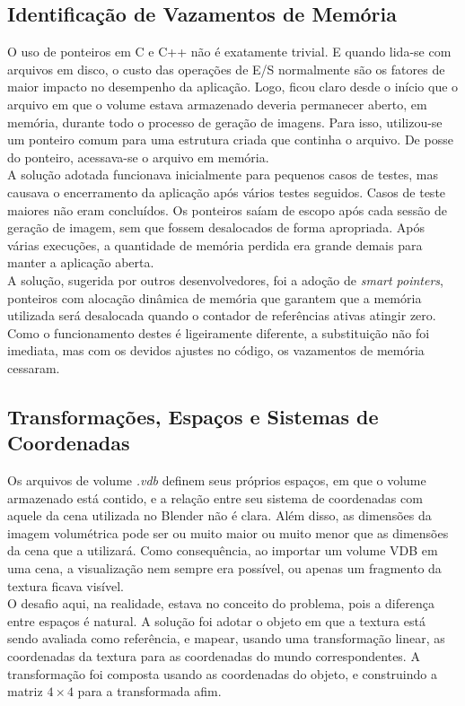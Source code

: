 \subsection*{Identificação de Vazamentos de Memória}
O uso de ponteiros em C e C++ não é exatamente trivial. E quando lida-se com arquivos em disco, o custo das operações de E/S normalmente são os fatores de maior impacto no desempenho da aplicação. Logo, ficou claro desde o início que o arquivo em que o volume estava armazenado deveria permanecer aberto, em memória, durante todo o processo de geração de imagens. Para isso, utilizou-se um ponteiro comum para uma estrutura criada que continha o arquivo. De posse do ponteiro, acessava-se o arquivo em memória.\\

A solução adotada funcionava inicialmente para pequenos casos de testes, mas causava o encerramento da aplicação após vários testes seguidos. Casos de teste maiores não eram concluídos. Os ponteiros saíam de escopo após cada sessão de geração de imagem, sem que fossem desalocados de forma apropriada. Após várias execuções, a quantidade de memória perdida era grande demais para manter a aplicação aberta.\\

A solução, sugerida por outros desenvolvedores, foi a adoção de \emph{smart pointers}, ponteiros com alocação dinâmica de memória que garantem que a memória utilizada será desalocada quando o contador de referências ativas atingir zero. Como o funcionamento destes é ligeiramente diferente, a substituição não foi imediata, mas com os devidos ajustes no código, os vazamentos de memória cessaram.

\subsection*{Transformações, Espaços e Sistemas de Coordenadas}
Os arquivos de volume {\it .vdb} definem seus próprios espaços, em que o volume armazenado está contido, e a relação entre seu sistema de coordenadas com aquele da cena utilizada no Blender não é clara. Além disso, as dimensões da imagem volumétrica pode ser ou muito maior ou muito menor que as dimensões da cena que a utilizará. Como consequência, ao importar um volume VDB em uma cena, a visualização nem sempre era possível, ou apenas um fragmento da textura ficava visível. \\

O desafio aqui, na realidade, estava no conceito do problema, pois a diferença entre espaços é natural. A solução foi adotar o objeto em que a textura está sendo avaliada como referência, e mapear, usando uma transformação linear, as coordenadas da textura para as coordenadas do mundo correspondentes. A transformação foi composta usando as coordenadas do objeto, e construindo a matriz $4 \times 4$ para a transformada afim.


